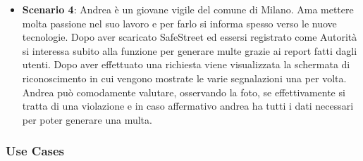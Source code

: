 \documentclass{article}
\begin{document}
\begin{itemize}
    \item \textbf{Scenario 4}:
    Andrea è un giovane vigile del comune di Milano. Ama mettere molta passione nel suo lavoro e per farlo si informa spesso verso le nuove tecnologie. 
    Dopo aver scaricato SafeStreet ed essersi registrato come Autorità si interessa subito alla funzione per generare multe grazie ai report fatti 
    dagli utenti. Dopo aver effettuato una richiesta viene visualizzata la schermata di riconoscimento in cui vengono mostrate le varie segnalazioni 
    una per volta. Andrea può comodamente valutare, osservando la foto, se effettivamente si tratta di una violazione e in caso affermativo andrea ha 
    tutti i dati necessari per poter generare una multa.
\end{itemize}

\subsubsection{Use Cases}
\clearpage
\end{document}
